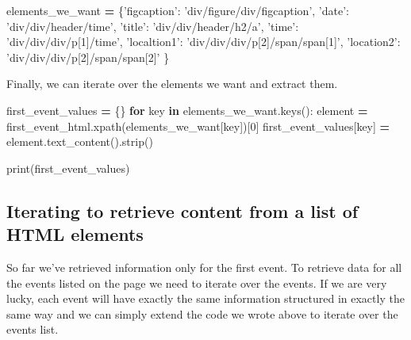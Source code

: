 \documentclass[]{book}
\newenvironment{Shaded}{\begin{snugshade}}{\end{snugshade}}
\newcommand{\BuiltInTok}[1]{#1}
\newcommand{\ControlFlowTok}[1]{\textcolor[rgb]{0.13,0.29,0.53}{\textbf{#1}}}
\newcommand{\DecValTok}[1]{\textcolor[rgb]{0.00,0.00,0.81}{#1}}
\newcommand{\KeywordTok}[1]{\textcolor[rgb]{0.13,0.29,0.53}{\textbf{#1}}}
\newcommand{\NormalTok}[1]{#1}
\newcommand{\OperatorTok}[1]{\textcolor[rgb]{0.81,0.36,0.00}{\textbf{#1}}}
\newcommand{\StringTok}[1]{\textcolor[rgb]{0.31,0.60,0.02}{#1}}
\begin{document}
\begin{Shaded}
\begin{Highlighting}[]
\NormalTok{elements_we_want }\OperatorTok{=}\NormalTok{ \{}\StringTok{'figcaption'}\NormalTok{: }\StringTok{'div/figure/div/figcaption'}\NormalTok{,}
                    \StringTok{'date'}\NormalTok{: }\StringTok{'div/div/header/time'}\NormalTok{,}
                    \StringTok{'title'}\NormalTok{: }\StringTok{'div/div/header/h2/a'}\NormalTok{,}
                    \StringTok{'time'}\NormalTok{: }\StringTok{'div/div/div/p[1]/time'}\NormalTok{,}
                    \StringTok{'localtion1'}\NormalTok{: }\StringTok{'div/div/div/p[2]/span/span[1]'}\NormalTok{,}
                    \StringTok{'location2'}\NormalTok{: }\StringTok{'div/div/div/p[2]/span/span[2]'}
\NormalTok{                    \}}
\end{Highlighting}
\end{Shaded}

Finally, we can iterate over the elements we want and extract them.

\begin{Shaded}
\begin{Highlighting}[]
\NormalTok{first_event_values }\OperatorTok{=}\NormalTok{ \{\}}
\ControlFlowTok{for}\NormalTok{ key }\KeywordTok{in}\NormalTok{ elements_we_want.keys():}
\NormalTok{    element }\OperatorTok{=}\NormalTok{ first_event_html.xpath(elements_we_want[key])[}\DecValTok{0}\NormalTok{]}
\NormalTok{    first_event_values[key] }\OperatorTok{=}\NormalTok{ element.text_content().strip()}

\BuiltInTok{print}\NormalTok{(first_event_values)}
\end{Highlighting}
\end{Shaded}

\hypertarget{iterating-to-retrieve-content-from-a-list-of-html-elements}{%
\subsection{Iterating to retrieve content from a list of HTML elements}\label{iterating-to-retrieve-content-from-a-list-of-html-elements}}

So far we've retrieved information only for the first event. To
retrieve data for all the events listed on the page we need to iterate
over the events. If we are very lucky, each event will have exactly
the same information structured in exactly the same way and we can
simply extend the code we wrote above to iterate over the events list.
\end{document}
